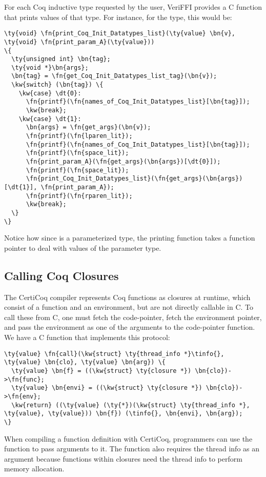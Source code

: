 For each Coq \gls{inductive type} requested by the user, VeriFFI provides a C function that prints values of that type.
For instance, for the  type, this would be:

\begin{Verbatim}
\ty{void} \fn{print_Coq_Init_Datatypes_list}(\ty{value} \bn{v}, \ty{void} \fn{print_param_A}(\ty{value}))
\{
  \ty{unsigned int} \bn{tag};
  \ty{void *}\bn{args};
  \bn{tag} = \fn{get_Coq_Init_Datatypes_list_tag}(\bn{v});
  \kw{switch} (\bn{tag}) \{
    \kw{case} \dt{0}:
      \fn{printf}(\fn{names_of_Coq_Init_Datatypes_list}[\bn{tag}]);
      \kw{break};
    \kw{case} \dt{1}:
      \bn{args} = \fn{get_args}(\bn{v});
      \fn{printf}(\fn{lparen_lit});
      \fn{printf}(\fn{names_of_Coq_Init_Datatypes_list}[\bn{tag}]);
      \fn{printf}(\fn{space_lit});
      \fn{print_param_A}(\fn{get_args}(\bn{args})[\dt{0}]);
      \fn{printf}(\fn{space_lit});
      \fn{print_Coq_Init_Datatypes_list}(\fn{get_args}(\bn{args})[\dt{1}], \fn{print_param_A});
      \fn{printf}(\fn{rparen_lit});
      \kw{break};
  \}
\}
\end{Verbatim}

Notice how since  is a parameterized type, the printing function takes a function pointer to deal with values of the parameter type.

\subsection{Calling Coq Closures}

The CertiCoq compiler represents Coq functions as \gls{closure}s at runtime, which consist of a function and an environment, but are not directly callable in C. To call these from C, one must fetch the code-pointer, fetch the environment pointer, and pass the environment as one of the arguments to the code-pointer function.  We have a C function that implements this protocol:

\begin{Verbatim}
\ty{value} \fn{call}(\kw{struct} \ty{thread_info *}\tinfo{}, \ty{value} \bn{clo}, \ty{value} \bn{arg}) \{
  \ty{value} \bn{f} = ((\kw{struct} \ty{closure *}) \bn{clo})->\fn{func};
  \ty{value} \bn{envi} = ((\kw{struct} \ty{closure *}) \bn{clo})->\fn{env};
  \kw{return} ((\ty{value} (\ty{*})(\kw{struct} \ty{thread_info *}, \ty{value}, \ty{value})) \bn{f}) (\tinfo{}, \bn{envi}, \bn{arg});
\}
\end{Verbatim}

When compiling a function definition with CertiCoq, programmers can use the  function to pass arguments to it. The  function also requires the \gls{thread info} as an argument because functions within \gls{closure}s need the \gls{thread info} to perform memory allocation.
